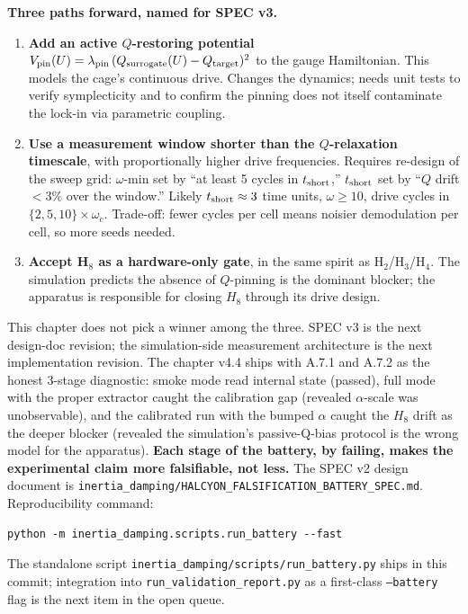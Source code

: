 \documentclass[12pt,a4paper]{article}
\theoremstyle{plain}
\theoremstyle{definition}
\theoremstyle{remark}
\begin{document}
\textbf{Three paths forward, named for SPEC v3.}
\begin{enumerate}
    \item \textbf{Add an active $Q$-restoring potential} $V_{\rm pin}(U) = \lambda_{\rm pin}\,(Q_{\rm surrogate}(U) - Q_{\rm target})^2$ to the gauge Hamiltonian. This models the cage's continuous drive. Changes the dynamics; needs unit tests to verify symplecticity and to confirm the pinning does not itself contaminate the lock-in via parametric coupling.
    \item \textbf{Use a measurement window shorter than the $Q$-relaxation timescale}, with proportionally higher drive frequencies. Requires re-design of the sweep grid: $\omega$-min set by ``at least 5 cycles in $t_{\rm short}$,'' $t_{\rm short}$ set by ``$Q$ drift $< 3\%$ over the window.'' Likely $t_{\rm short} \approx 3$ time units, $\omega \geq 10$, drive cycles in $\{2, 5, 10\}\times\omega_c$. Trade-off: fewer cycles per cell means noisier demodulation per cell, so more seeds needed.
    \item \textbf{Accept H$_8$ as a hardware-only gate}, in the same spirit as H$_2$/H$_3$/H$_4$. The simulation predicts the absence of $Q$-pinning is the dominant blocker; the apparatus is responsible for closing $H_8$ through its drive design.
\end{enumerate}

This chapter does not pick a winner among the three. SPEC v3 is the next design-doc revision; the simulation-side measurement architecture is the next implementation revision. The chapter v4.4 ships with A.7.1 and A.7.2 as the honest 3-stage diagnostic: smoke mode read internal state (passed), full mode with the proper extractor caught the calibration gap (revealed $\alpha$-scale was unobservable), and the calibrated run with the bumped $\alpha$ caught the $H_8$ drift as the deeper blocker (revealed the simulation's passive-Q-bias protocol is the wrong model for the apparatus). \textbf{Each stage of the battery, by failing, makes the experimental claim more falsifiable, not less.} The SPEC v2 design document is \texttt{inertia\_damping/HALCYON\_FALSIFICATION\_BATTERY\_SPEC.md}. Reproducibility command:
\begin{verbatim}
python -m inertia_damping.scripts.run_battery --fast
\end{verbatim}
The standalone script \texttt{inertia\_damping/scripts/run\_battery.py} ships in this commit; integration into \texttt{run\_validation\_report.py} as a first-class \texttt{--battery} flag is the next item in the open queue.
\end{document}
